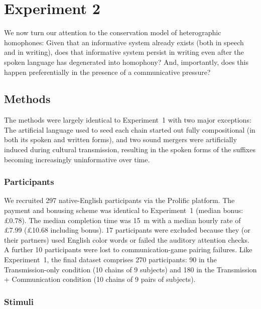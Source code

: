 \documentclass[doc,biblatex]{apa7}
\begin{document}
\section{Experiment 2}

We now turn our attention to the conservation model of heterographic homophones: Given that an informative system already exists (both in speech and in writing), does that informative system persist in writing even after the spoken language has degenerated into homophony? And, importantly, does this happen preferentially in the presence of a communicative pressure?

\subsection{Methods}

The methods were largely identical to Experiment~1 with two major exceptions: The artificial language used to seed each chain started out fully compositional (in both its spoken and written forms), and two sound mergers were artificially induced during cultural transmission, resulting in the spoken forms of the suffixes becoming increasingly uninformative over time.

\subsubsection{Participants}

We recruited 297 native-English participants via the Prolific platform. The payment and bonusing scheme was identical to Experiment~1 (median bonus: £0.78). The median completion time was 15~m with a median hourly rate of £7.99 (£10.68 including bonus). 17 participants were excluded because they (or their partners) used English color words or failed the auditory attention checks. A further 10 participants were lost to communication-game pairing failures. Like Experiment~1, the final dataset comprises 270 participants: 90 in the Transmission-only condition (10 chains of 9 subjects) and 180 in the Transmission + Communication condition (10 chains of 9 pairs of subjects).

\subsubsection{Stimuli}
\end{document}
